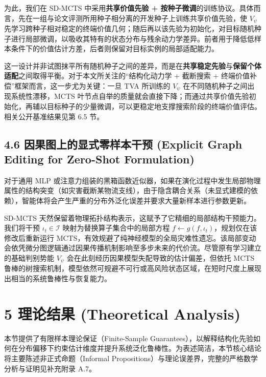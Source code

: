 \documentclass[UTF8]{ctexart}
\begin{document}
为此，我们在 SD-MCTS 中采用\textbf{共享价值先验 + 按种子微调}的训练协议。具体而言，先在一组与论文评测所用种子相分离的开发种子上训练共享价值先验，使 \(V_\psi\) 先学习跨种子相对稳定的终端价值几何；随后再以该先验为初始化，对目标随机种子进行局部微调，以吸收其特有的状态分布与残余动力学差异。前者用于降低低样本条件下的价值估计方差，后者则保留对目标实例的局部适配能力。

这一设计并非试图抹平所有随机种子之间的差异，而是在\textbf{共享稳定先验}与\textbf{保留个体适配}之间取得平衡。对于本文所关注的“结构化动力学 + 截断搜索 + 终端价值补偿”框架而言，这一步尤为关键：一旦 TVA 所训练的 \(V_\psi\) 在不同随机种子之间出现系统性漂移，MCTS 叶节点自举的质量就会直接下降；而通过共享价值先验初始化，再辅以目标种子的少量微调，可以更稳定地支撑搜索阶段的终端价值评估。相关公开基准结果见第 6.5 节。

\hypertarget{sub-zero-shot}{%
\subsection{4.6 因果图上的显式零样本干预 (Explicit Graph Editing for Zero-Shot Formulation)}\label{sub-zero-shot}}

对于通用 MLP 或注意力组装的黑箱函数近似器，如果在演化过程中发生局部物理属性的结构突变（如灾害截断某物流支线），由于隐含耦合关系（未显式建模的依赖），智能体将会产生严重的分布外泛化误差并要求大量新样本进行参数更新。

SD-MCTS 天然保留着物理拓扑结构表示，这赋予了它精细的局部结构干预能力。我们将干预 $\iota_t \in \mathcal{I}$ 映射为替换算子集合中的局部方程 $f \leftarrow g(f, \iota_t)$，规划仅在该修改后重新运行 MCTS，有效规避了纯神经模型的全局灾难性遗忘。该局部变动会依凭微分图逻辑通过因果传播机制影响至多步未来的代价流。尽管原有学习建立的基础判别势能 $V_\psi$ 会在此刻经历因果模型失配导致的估计偏差，但依托 MCTS 鲁棒的树搜索机制，模型依然可规避不可行或高风险状态区域，在短时尺度上展现出相当的系统鲁棒性与恢复能力。

\hypertarget{ux7406ux8bbaux7ed3ux679c-theoretical-analysis}{%
\section{5 理论结果 (Theoretical
Analysis)}\label{ux7406ux8bbaux7ed3ux679c-theoretical-analysis}}

本节提供了有限样本理论保证（Finite-Sample Guarantees），以解释结构化先验如何在分布偏移下约束估计维度并提升系统泛化鲁棒性。为表述简洁，本节核心结论将主要陈述非正式命题（Informal Propositions）与理论误差界，完整的严格数学分析与证明见补充附录 A.7。
\end{document}
